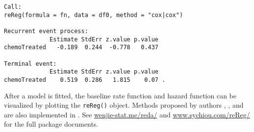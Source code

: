 \begin{verbatim}
Call: 
reReg(formula = fn, data = df0, method = "cox|cox")

Recurrent event process:
             Estimate StdErr z.value p.value
chemoTreated   -0.189  0.244  -0.778   0.437

Terminal event:
             Estimate StdErr z.value p.value  
chemoTreated    0.519  0.286   1.815    0.07 .
\end{verbatim}

After a model is fitted, the baseline rate function and hazard function
can be visualized by plotting the \texttt{reReg()} object. Methods
proposed by authors \citet{lin2000semiparametric},
\citet{ghosh2002marginal}, and \citet{ghosh2003semiparametric} are also
implemented in . See \url{wenjie-stat.me/reda/} and
\url{www.sychiou.com/reReg/} for the full package documents.
